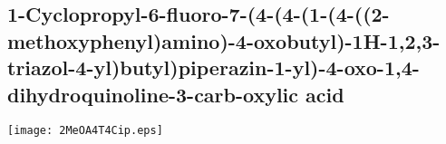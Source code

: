 \subsection{1\hyp{}Cyclopropyl\hyp{}6\hyp{}fluoro\hyp{}7\hyp{}(4\hyp{}(4\hyp{}(1\hyp{}(4\hyp{}((2\hyp{}methoxyphenyl)amino)\hyp{}4\hyp{}oxobutyl)\hyp{}1H\hyp{}1,2,3\hyp{}triazol\hyp{}4\hyp{}yl)butyl)piperazin\hyp{}1\hyp{}yl)\hyp{}4\hyp{}oxo\hyp{}1,4\hyp{}dihydroquinoline\hyp{}3\hyp{}carb\hyp{}oxylic acid }


\begin{scheme}[H]
	\begin{center}
		\texttt{[image: 2MeOA4T4Cip.eps]}
	\end{center}
\end{scheme}

